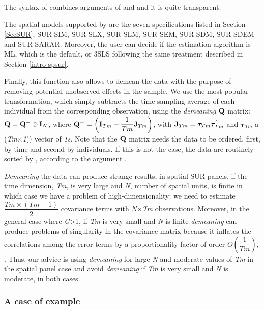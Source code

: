 \documentclass[article]{jss}
\begin{document}
The syntax of  combines arguments of  and  and it is quite transparent:


The spatial models supported by  are the seven specifications listed in Section \ref{SecSUR}, SUR-SIM, SUR-SLX, SUR-SLM, SUR-SEM, SUR-SDM, SUR-SDEM and SUR-SARAR. Moreover, the user can decide if the estimation algorithm is ML, which is the default, or 3SLS following the same treatment described in Section \ref{intro-spsur}.

Finally, this function also allows to demean the data with the purpose of removing potential unobserved effects in the sample. We use the most popular transformation, which simply subtracts the time sampling average of each individual from the corresponding observation, using the \emph{demeaning} \(\bf Q\) matrix: \({\bf Q}= {\bf Q}^{+} \otimes {\bf I}_{N}\), where \({\bf Q}^{+}=\left({\bf I}_{Tm}-\dfrac{1}{Tm}{\bf J}_{Tm}\right)\), with \({\bf J}_{Tm}={\boldsymbol \tau}_{Tm}{\boldsymbol \tau}_{Tm}^{'}\) and \({\boldsymbol \tau}_{Tm}\) a (\emph{Tm}\(\times\)\emph{1})) vector of \emph{1s}. Note that the \(\bf Q\) matrix needs the data to be ordered, first, by time and second by individuals. If this is not the case, the data are routinely sorted by , according to the argument .

\emph{Demeaning} the data can produce strange results, in spatial SUR panels, if the time dimension, \emph{Tm}, is very large and \emph{N}, number of spatial units, is finite in which case we have a problem of high-dimensionality: we need to estimate \(\dfrac{Tm \times (Tm-1)}{2}\) covariance terms with \emph{N}\(\times\)\emph{Tm} observations. Moreover, in the general case where \emph{G}\textgreater{}1, if \emph{Tm} is very small and \emph{N} is finite \emph{demeaning} can produce problems of singularity in the covariance matrix because it inflates the correlations among the error terms by a proportionality factor of order \(O(\dfrac{1}{Tm})\), \citep{Hsiao2003}. Thus, our advice is using \emph{demeaning} for large \emph{N} and moderate values of \emph{Tm} in the spatial panel case and avoid \emph{demeaning} if \emph{Tm} is very small and \emph{N} is moderate, in both cases.

\hypertarget{a-case-of-example}{%
\subsubsection{A case of example}\label{a-case-of-example}}
\end{document}
